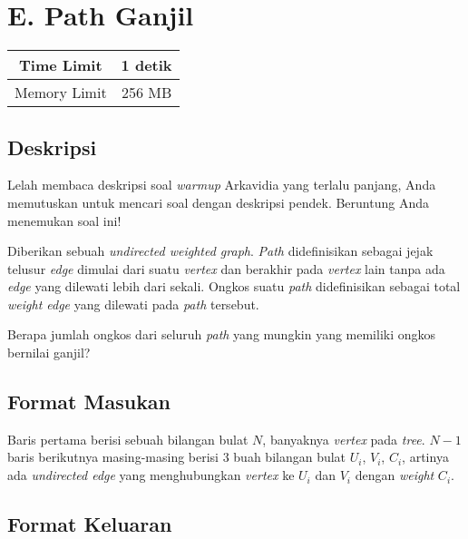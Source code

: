 \documentclass{article}
\begin{document}
\section*{\hfil E. Path Ganjil\hfil}

\begin{center}
\begin{tabular}{ |cc| } 
 \hline
 Time Limit & 1 detik \\ 
 \hline
 Memory Limit & 256 MB \\
 \hline
\end{tabular}
\end{center}

\subsection*{Deskripsi}
\par\noindent
Lelah membaca deskripsi soal  \textit{warmup} Arkavidia yang terlalu panjang, Anda memutuskan untuk mencari soal dengan deskripsi pendek. Beruntung Anda menemukan soal ini!
\newline
\par\noindent
Diberikan sebuah \textit{undirected weighted graph}.  \textit{Path} didefinisikan sebagai jejak telusur  \textit{edge} dimulai dari suatu  \textit{vertex} dan berakhir pada  \textit{vertex} lain tanpa ada  \textit{edge} yang dilewati lebih dari sekali. Ongkos suatu  \textit{path} didefinisikan sebagai total  \textit{weight edge} yang dilewati pada  \textit{path} tersebut. 
\newline
\par\noindent
Berapa jumlah ongkos dari seluruh  \textit{path} yang mungkin yang memiliki ongkos bernilai ganjil?

\subsection*{Format Masukan}
\par\noindent Baris pertama berisi sebuah bilangan bulat $N$, banyaknya  \textit{vertex} pada  \textit{tree}. $N-1$ baris berikutnya masing-masing berisi $3$ buah bilangan bulat $U_i$, $V_i$, $C_i$, artinya ada  \textit{undirected edge} yang menghubungkan  \textit{vertex} ke $U_i$ dan $V_i$ dengan  \textit{weight} $C_i$.

\subsection*{Format Keluaran}
\end{document}
